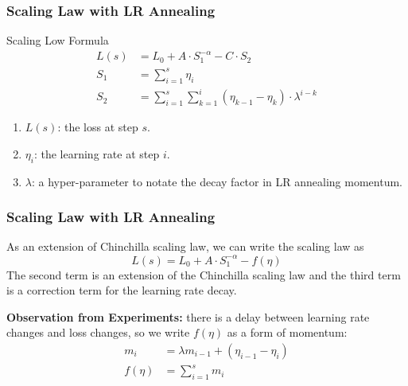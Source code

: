 \documentclass[aspectratio=169]{beamer}
\begin{document}
    \begin{frame}
        \frametitle{Scaling Law with LR Annealing}
        \begin{block}{Scaling Low Formula}
            \begin{equation}
                \label{eq:scaling_low}
                \begin{aligned}
                    L(s) &= L_0 + A\cdot S_1^{-\alpha} - C\cdot S_2 \\
                    S_1 &= \sum_{i=1}^{s} \eta_i \\
                    S_2 &= \sum_{i=1}^{s} \sum_{k=1}^{i} (\eta_{k-1} -
                    \eta_k)\cdot\lambda^{i-k}
                \end{aligned}
            \end{equation}
        \end{block}

        \begin{enumerate}
            \item $L(s)$: the loss at step $s$.
            \item $\eta_i$: the learning rate at step $i$.
            \item $\lambda$: a hyper-parameter to notate the decay factor
            in LR annealing momentum.
        \end{enumerate}
    \end{frame}

    \begin{frame}
        \frametitle{Scaling Law with LR Annealing}
        As an extension of Chinchilla scaling law, we can write the scaling law as
        \begin{equation}
            L(s) = L_0 + A\cdot S_1^{-\alpha} - f(\eta)
        \end{equation}
        The second term is an extension of the Chinchilla scaling law and
        the third term is a correction term for the learning rate decay.

        \textbf{Observation from Experiments:} there is a delay between
        learning rate
        changes and loss changes, so we write $f(\eta)$ as a form of momentum:
        \begin{equation}
            \begin{aligned}
                m_i &= \lambda m_{i-1} + (\eta_{i-1} - \eta_i) \\
                f(\eta) &= \sum_{i=1}^{s} m_i
            \end{aligned}
        \end{equation}
    \end{frame}
\end{document}
